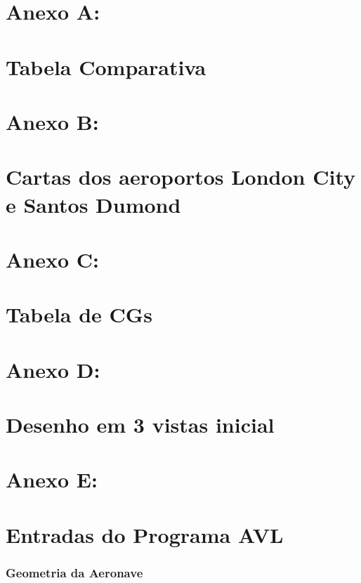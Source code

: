 \part*{Anexo A:\\~\\ Tabela Comparativa}
\label{anexoA}
  

\part*{Anexo B:\\~\\ Cartas dos aeroportos London City e Santos Dumond}
\label{anexoB}
  
  
  

\part*{Anexo C:\\~\\ Tabela de CGs}
\label{anexoC}
  

\part*{Anexo D:\\~\\ Desenho em 3 vistas inicial}
\label{anexoD}
  


\part*{Anexo E:\\~\\ Entradas do Programa AVL}
\label{anexoE}
\section*{Geometria da Aeronave}



